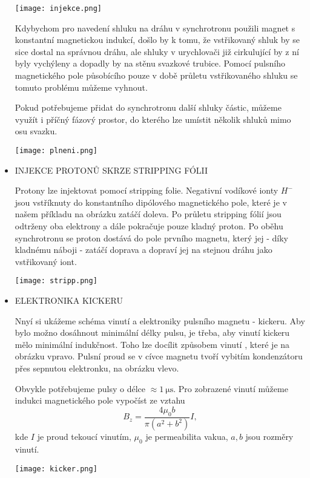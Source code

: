\documentclass[../../main.tex]{subfiles}
\begin{document}
\begin{itemize}
	 \begin{center}
		\texttt{[image: injekce.png]}
	\end{center}
	
	Kdybychom pro navedení shluku na dráhu v synchrotronu použili magnet s konstantní magnetickou indukcí, došlo by k tomu, že vstřikovaný shluk by se sice dostal na správnou dráhu, ale shluky v urychlovači již cirkulující by z ní byly vychýleny a dopadly by na stěnu svazkové trubice. Pomocí pulsního magnetického pole působícího pouze v době průletu vstřikovaného shluku se tomuto problému můžeme vyhnout.
	
	Pokud potřebujeme přidat do synchrotronu další shluky částic, můžeme využít i příčný fázový prostor, do kterého lze umístit několik shluků mimo osu svazku. 
	
    \begin{center}
   	\texttt{[image: plneni.png]}
   \end{center}

	\item INJEKCE PROTONŮ SKRZE STRIPPING FÓLII 
	
	Protony lze injektovat pomocí stripping folie. Negativní vodíkové ionty $H^-$ jsou vstříknuty do konstantního dipólového magnetického pole, které je v našem příkladu na obrázku zatáčí doleva. Po průletu stripping fólií jsou odtrženy oba elektrony a dále pokračuje pouze kladný proton. Po oběhu synchrotronu se proton dostává do pole prvního magnetu, který jej - díky kladnému náboji - zatáčí doprava a dopraví jej na stejnou dráhu jako vstřikovaný iont.
	
	\begin{center}
		\texttt{[image: stripp.png]}
	\end{center}
	
	\item ELEKTRONIKA KICKERU 
	
	Nnyí si ukážeme schéma vinutí a elektroniky pulsního magnetu - kickeru. Aby bylo možno dosáhnout minimální délky pulsu, je třeba, aby vinutí kickeru mělo minimální indukčnost. Toho lze docílit způsobem vinutí , které je na obrázku vpravo. Pulsní proud se v cívce magnetu tvoří vybitím kondenzátoru přes sepnutou elektronku, na obrázku vlevo.
	
	Obvykle potřebujeme pulsy o délce $\approx 1 ~\mathrm{\mu s}$. Pro zobrazené vinutí můžeme indukci magnetického pole vypočíst ze vztahu
	\begin{equation}
	B_z = \dfrac{4 \mu_0 b}{\pi (a^2 + b^2)} I,
	\end{equation}
	kde $I$ je proud tekoucí vinutím, $\mu_0$ je permeabilita vakua, $a,b$ jsou rozměry vinutí.
	
	\begin{center}
		\texttt{[image: kicker.png]}
	\end{center}
	
\end{itemize}
\end{document}
